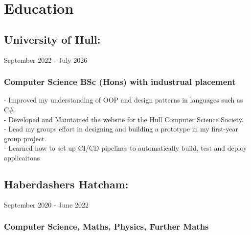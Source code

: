 \section{Education}

\subsection{University of Hull:} September 2022 - July 2026 \\

\subsubsection{Computer Science BSc (Hons) with industrual placement}

-\: Improved my understanding of OOP and design patterns in languages such as C\#\\
-\: Developed and Maintained the website for the Hull Computer Science Society. \\
-\: Lead my groups effort in designing and building a prototype in my first-year group project. \\ 
-\: Learned how to set up CI/CD pipelines to automatically build, test and deploy applicaitons

\vspace{10pt}
\subsection{Haberdashers Hatcham:} September 2020 - June 2022 \\ 

\subsubsection{Computer Science, Maths, Physics, Further Maths}
